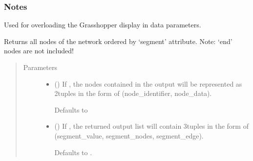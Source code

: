 \documentclass[letterpaper,10pt,english]{sphinxmanual}
\begin{document}
\begin{fulllineitems}
\begin{fulllineitems}
\subsubsection*{Notes}

Used for overloading the Grasshopper display in data parameters.

\end{fulllineitems}


\begin{fulllineitems}
\label{\detokenize{cockatoo:cockatoo.KnitNetwork.all_nodes_by_segment}}
Returns all nodes of the network ordered by ‘segment’ attribute.
Note: ‘end’ nodes are not included!
\begin{quote}\begin{description}
\item[{Parameters}] \leavevmode\begin{itemize}
\item {} 
 (\sphinxstyleliteralemphasis{\sphinxupquote{, }}) \textendash{} 
If , the nodes contained in the output will be represented
as 2\sphinxhyphen{}tuples in the form of (node\_identifier, node\_data).

Defaults to 


\item {} 
 (\sphinxstyleliteralemphasis{\sphinxupquote{, }}) \textendash{} 
If , the returned output list will contain 3\sphinxhyphen{}tuples in the
form of (segment\_value, segment\_nodes, segment\_edge).

Defaults to .


\end{itemize}


\end{description}
\end{quote}
\end{fulllineitems}
\end{fulllineitems}
\end{document}
